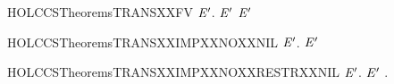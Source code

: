 \newcommand{\HOLCCSTheoremsTRANSXXCOMMXXEQ}{\UseVerbatim{HOLCCSTheoremsTRANSXXCOMMXXEQ}}
\begin{SaveVerbatim}{HOLCCSTheoremsTRANSXXFV}
\HOLTokenTurnstile{} \HOLSymConst{\HOLTokenForall{}}  \ensuremath{\HOLBoundVar{E}\sp{\prime}}.  \HOLTokenTransBegin{}\HOLTokenTransEnd \ensuremath{\HOLBoundVar{E}\sp{\prime}} \HOLSymConst{\HOLTokenImp{}}  \ensuremath{\HOLBoundVar{E}\sp{\prime}} \HOLConst{\HOLTokenSubset{}}  
\end{SaveVerbatim}
\newcommand{\HOLCCSTheoremsTRANSXXFV}{\UseVerbatim{HOLCCSTheoremsTRANSXXFV}}
\begin{SaveVerbatim}{HOLCCSTheoremsTRANSXXIMPXXNOXXNIL}
\HOLTokenTurnstile{} \HOLSymConst{\HOLTokenForall{}}  \ensuremath{\HOLBoundVar{E}\sp{\prime}}.  \HOLTokenTransBegin{}\HOLTokenTransEnd \ensuremath{\HOLBoundVar{E}\sp{\prime}} \HOLSymConst{\HOLTokenImp{}}  \HOLSymConst{\HOLTokenNotEqual{}} 
\end{SaveVerbatim}
\newcommand{\HOLCCSTheoremsTRANSXXIMPXXNOXXNIL}{\UseVerbatim{HOLCCSTheoremsTRANSXXIMPXXNOXXNIL}}
\begin{SaveVerbatim}{HOLCCSTheoremsTRANSXXIMPXXNOXXRESTRXXNIL}
\HOLTokenTurnstile{} \HOLSymConst{\HOLTokenForall{}}  \ensuremath{\HOLBoundVar{E}\sp{\prime}}.  \HOLTokenTransBegin{}\HOLTokenTransEnd \ensuremath{\HOLBoundVar{E}\sp{\prime}} \HOLSymConst{\HOLTokenImp{}} \HOLSymConst{\HOLTokenForall{}}.  \HOLSymConst{\HOLTokenNotEqual{}}   
\end{SaveVerbatim}
\newcommand{\HOLCCSTheoremsTRANSXXIMPXXNOXXRESTRXXNIL}{\UseVerbatim{HOLCCSTheoremsTRANSXXIMPXXNOXXRESTRXXNIL}}
